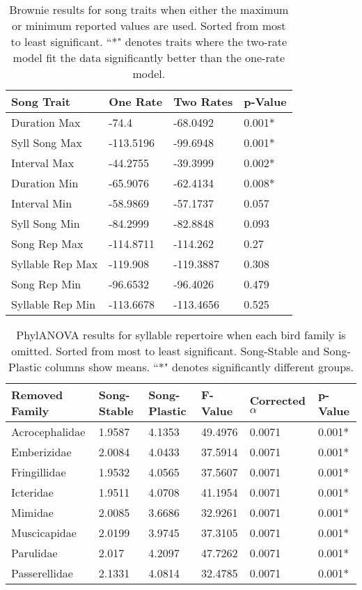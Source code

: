 \documentclass[a4paper,12pt]{article}
\begin{document}
\begin{table}[ht]
\caption{Brownie results for song traits when either the maximum or minimum reported values are used.  Sorted from most to least significant.  ``*" denotes traits where the two-rate model fit the data significantly better than the one-rate model.}
\centering
\begin{tabular}{llll}
  \hline
Song Trait & One Rate & Two Rates & p-Value \\ 
  \hline
Duration Max & -74.4 & -68.0492 & 0.001* \\ 
  Syll Song Max & -113.5196 & -99.6948 & 0.001* \\ 
  Interval Max & -44.2755 & -39.3999 & 0.002* \\ 
  Duration Min & -65.9076 & -62.4134 & 0.008* \\ 
  Interval Min & -58.9869 & -57.1737 & 0.057 \\ 
  Syll Song Min & -84.2999 & -82.8848 & 0.093 \\ 
  Song Rep Max & -114.8711 & -114.262 & 0.27 \\ 
  Syllable Rep Max & -119.908 & -119.3887 & 0.308 \\ 
  Song Rep Min & -96.6532 & -96.4026 & 0.479 \\ 
  Syllable Rep Min & -113.6678 & -113.4656 & 0.525 \\ 
   \hline
\end{tabular}
\end{table}

\begin{table}[ht]
\caption{PhylANOVA results for syllable repertoire when each bird family is omitted.  Sorted from most to least significant.  Song-Stable and Song-Plastic columns show means.  ``*" denotes significantly different groups.}
\centering
\begin{tabular}{llllll}
  \hline
Removed Family & Song-Stable & Song-Plastic & F-Value & Corrected $\alpha$ & p-Value \\ 
  \hline
Acrocephalidae & 1.9587 & 4.1353 & 49.4976 & 0.0071 & 0.001* \\ 
  Emberizidae & 2.0084 & 4.0433 & 37.5914 & 0.0071 & 0.001* \\ 
  Fringillidae & 1.9532 & 4.0565 & 37.5607 & 0.0071 & 0.001* \\ 
  Icteridae & 1.9511 & 4.0708 & 41.1954 & 0.0071 & 0.001* \\ 
  Mimidae & 2.0085 & 3.6686 & 32.9261 & 0.0071 & 0.001* \\ 
  Muscicapidae & 2.0199 & 3.9745 & 37.3105 & 0.0071 & 0.001* \\ 
  Parulidae & 2.017 & 4.2097 & 47.7262 & 0.0071 & 0.001* \\ 
  Passerellidae & 2.1331 & 4.0814 & 32.4785 & 0.0071 & 0.001* \\ 
   \hline
\end{tabular}
\end{table}
\end{document}
